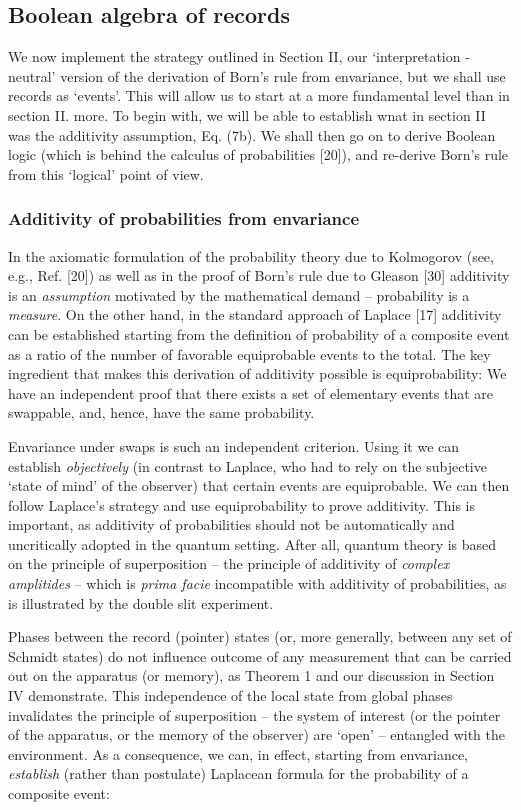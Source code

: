 \documentclass[aps,pra,epsfig,11pt,floatfix]{revtex4}
\begin{document}
\subsection{Boolean algebra of records}

We now implement the strategy outlined in Section II, our  `interpretation -
neutral' version of the derivation of Born's rule from envariance, but we
shall use records as `events'.  This will allow us to start at a more fundamental
level than in section II. more. To begin with, we will be able to establish
wnat in section II was the additivity assumption, Eq. (7b). We shall then go on to
derive Boolean logic (which is behind the calculus of probabilities [20]), and
re-derive Born's rule from this `logical' point of view. 

\subsubsection{Additivity of probabilities from envariance}

In the axiomatic formulation of the probability theory due to Kolmogorov 
(see, e.g., Ref. [20]) as well as in the proof of Born's rule due to Gleason [30] 
additivity is an {\it assumption} motivated by the mathematical demand 
-- probability is a {\it measure}. On the other hand, in the standard
approach of Laplace [17] additivity can be established starting from the definition
of probability of a composite event as a ratio of the number of favorable
equiprobable events to the total. The key ingredient that makes this derivation
of additivity possible is equiprobability: We have an independent proof that 
there exists a set of elementary events that are swappable, and, hence, have
the same probability. 

Envariance under swaps is such an independent criterion. Using it we can 
establish {\it objectively} (in contrast to Laplace, who had to rely on the subjective
`state of mind' of the observer) that certain events are equiprobable. We can 
then follow Laplace's strategy and use equiprobability to prove additivity.
This is important, as  additivity of probabilities should not be automatically 
and uncritically adopted in the quantum setting. After all, quantum theory 
is based on the principle of superposition -- the principle of additivity of 
{\it complex amplitides} -- which is {\it prima facie} incompatible with additivity 
of probabilities, as is illustrated by the double slit experiment.

Phases between the record (pointer) states (or, more generally, between any set
of Schmidt states) do not influence outcome of any measurement that can be
carried out on the apparatus (or memory), as Theorem 1 and our discussion
in Section IV demonstrate. This independence of the local state from global phases
invalidates the principle of superposition -- the system of interest (or the
pointer of the apparatus, or the memory of the observer) are `open' 
-- entangled
with the environment. As a consequence, we can, in effect, starting from
envariance, {\it establish} (rather than postulate) Laplacean formula for
the probability of a composite event:
\end{document}
